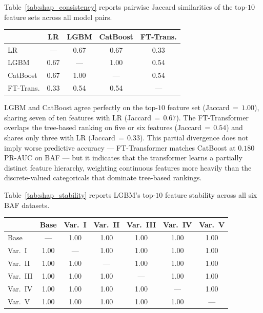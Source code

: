\documentclass[a4paper,fleqn]{cas-sc}
\begin{document}
Table~\ref{tab:shap_consistency} reports pairwise Jaccard similarities of the
top-$10$ feature sets across all model pairs.

\noindent\begin{minipage}{\linewidth}\centering
{}
\label{tab:shap_consistency}
\begin{tabular}{l c c c c}
\toprule
          & LR   & LGBM & CatBoost & FT-Trans. \\
\midrule
LR        & ---  & 0.67 & 0.67 & 0.33 \\
LGBM      & 0.67 & ---  & 1.00 & 0.54 \\
CatBoost  & 0.67 & 1.00 & ---  & 0.54 \\
FT-Trans. & 0.33 & 0.54 & 0.54 & ---  \\
\bottomrule
\end{tabular}
\end{minipage}

LGBM and CatBoost agree perfectly on the top-$10$ feature set (Jaccard\,$=\,1.00$),
sharing seven of ten features with LR (Jaccard\,$=\,0.67$).
The FT-Transformer overlaps the tree-based ranking on five or six features
(Jaccard\,$=\,0.54$) and shares only three with LR (Jaccard\,$=\,0.33$).
This partial divergence does not imply worse predictive accuracy --- FT-Transformer
matches CatBoost at $0.180$ PR-AUC on BAF --- but it indicates that the transformer
learns a partially distinct feature hierarchy, weighting continuous features
more heavily than the discrete-valued categoricals that dominate tree-based rankings.

Table~\ref{tab:shap_stability} reports LGBM's top-$10$ feature stability
across all six BAF datasets.

\noindent\begin{minipage}{\linewidth}\centering
{}
\label{tab:shap_stability}
\begin{tabular}{l c c c c c c}
\toprule
         & Base & Var.~I & Var.~II & Var.~III & Var.~IV & Var.~V \\
\midrule
Base      & ---  & 1.00 & 1.00 & 1.00 & 1.00 & 1.00 \\
Var.~I    & 1.00 & ---  & 1.00 & 1.00 & 1.00 & 1.00 \\
Var.~II   & 1.00 & 1.00 & ---  & 1.00 & 1.00 & 1.00 \\
Var.~III  & 1.00 & 1.00 & 1.00 & ---  & 1.00 & 1.00 \\
Var.~IV   & 1.00 & 1.00 & 1.00 & 1.00 & ---  & 1.00 \\
Var.~V    & 1.00 & 1.00 & 1.00 & 1.00 & 1.00 & --- \\
\bottomrule
\end{tabular}
\end{minipage}
\end{document}
